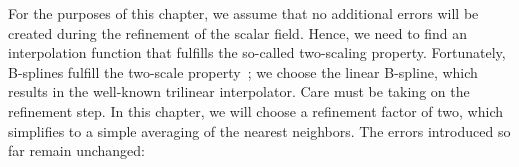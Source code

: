 
For the purposes of this chapter, we assume that no additional 
errors will be created during the refinement of the scalar field. 
Hence, we need to find an interpolation function that fulfills the 
so-called two-scaling property. Fortunately, B-splines fulfill the 
two-scale property~\cite{799930}; we choose the linear B-spline, 
which results in the well-known trilinear interpolator. Care must 
be taking on the refinement step. In this chapter, we will choose a 
refinement factor of two, which simplifies to a simple averaging of 
the nearest neighbors. The errors introduced so far remain 
unchanged:

